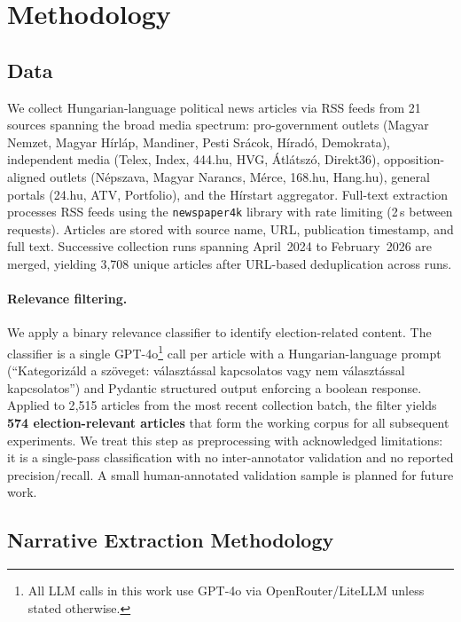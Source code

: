 \documentclass[10pt, a4paper]{article}
\begin{document}
\section{Methodology}
\label{sec:method}

\subsection{Data}
\label{sec:data}

We collect Hungarian-language political news articles via RSS feeds from 21 sources spanning the broad media spectrum: pro-government outlets (Magyar Nemzet, Magyar H\'irl\'ap, Mandiner, Pesti Sr\'acok, H\'irad\'o, Demokrata), independent media (Telex, Index, 444.hu, HVG, \'Atl\'atsz\'o, Direkt36), opposition-aligned outlets (N\'epszava, Magyar Narancs, M\'erce, 168.hu, Hang.hu), general portals (24.hu, ATV, Portfolio), and the H\'irstart aggregator. Full-text extraction processes RSS feeds using the \texttt{newspaper4k} library with rate limiting (2\,s between requests). Articles are stored with source name, URL, publication timestamp, and full text. Successive collection runs spanning April~2024 to February~2026 are merged, yielding 3{,}708 unique articles after URL-based deduplication across runs.

\paragraph{Relevance filtering.}
We apply a binary relevance classifier to identify election-related content. The classifier is a single GPT-4o\footnote{All LLM calls in this work use GPT-4o via OpenRouter/LiteLLM unless stated otherwise.} call per article with a Hungarian-language prompt (``Kategoriz\'ald a sz\"oveget: v\'alaszt\'assal kapcsolatos vagy nem v\'alaszt\'assal kapcsolatos'') and Pydantic structured output enforcing a boolean response. Applied to 2{,}515 articles from the most recent collection batch, the filter yields \textbf{574 election-relevant articles} that form the working corpus for all subsequent experiments. We treat this step as preprocessing with acknowledged limitations: it is a single-pass classification with no inter-annotator validation and no reported precision/recall. A small human-annotated validation sample is planned for future work.


\subsection{Narrative Extraction Methodology}
\label{sec:extraction}
\end{document}
